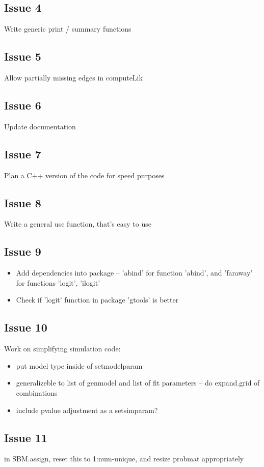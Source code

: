 \documentclass[11pt]{article}
\begin{document}
\subsection*{Issue 4}
Write generic print / summary functions

\subsection*{Issue 5}
Allow partially missing edges in computeLik

\subsection*{Issue 6}
Update documentation

\subsection*{Issue 7}
Plan a C++ version of the code for speed purposes

\subsection*{Issue 8}
Write a general use function, that's easy to use

\subsection*{Issue 9}
\begin{itemize}
\item Add dependencies into package -- 'abind' for function 'abind', and 'faraway' for functions 'logit', 'ilogit'
\item Check if 'logit' function in package 'gtools' is better
\end{itemize}

\subsection*{Issue 10}
Work on simplifying simulation code: 
\begin{itemize}
\item put model type inside of setmodelparam
\item generalizeble to list of genmodel and list of fit parameters -- do expand.grid of combinations
\item include pvalue adjustment as a setsimparam?
\end{itemize}

\subsection*{Issue 11}
in SBM.assign, reset this to 1:num-unique, and resize probmat appropriately
\end{document}
